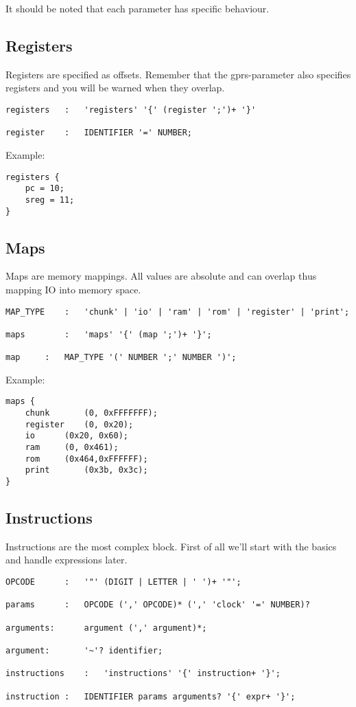 It should be noted that each parameter has specific behaviour.

\subsection{Registers}
Registers are specified as offsets. Remember that the gprs-parameter also
specifies registers and you will be warned when they overlap.
\begin{lstlisting}
registers	:	'registers' '{' (register ';')+ '}'

register	:	IDENTIFIER '=' NUMBER;
\end{lstlisting}

Example:
\begin{lstlisting}
registers {
	pc = 10;
	sreg = 11;
}
\end{lstlisting}

\subsection{Maps}
Maps are memory mappings. All values are absolute and can overlap thus mapping
IO into memory space.
\begin{lstlisting}
MAP_TYPE	:	'chunk' | 'io' | 'ram' | 'rom' | 'register' | 'print';

maps		:	'maps' '{' (map ';')+ '}';

map		:	MAP_TYPE '(' NUMBER ';' NUMBER ')';
\end{lstlisting}

Example:
\begin{lstlisting}
maps {
	chunk		(0, 0xFFFFFFF);
	register	(0, 0x20);
	io		(0x20, 0x60);
	ram		(0, 0x461);
	rom		(0x464,0xFFFFFF);
	print		(0x3b, 0x3c);
}
\end{lstlisting}

\subsection{Instructions}
Instructions are the most complex block. First of all we'll start with the
basics and handle expressions later.

\begin{lstlisting}
OPCODE		:	'"' (DIGIT | LETTER | ' ')+ '"';

params		:	OPCODE (',' OPCODE)* (',' 'clock' '=' NUMBER)?

arguments:		argument (',' argument)*;

argument:		'~'? identifier;

instructions	:	'instructions' '{' instruction+ '}';

instruction	:	IDENTIFIER params arguments? '{' expr+ '}';
\end{lstlisting}

